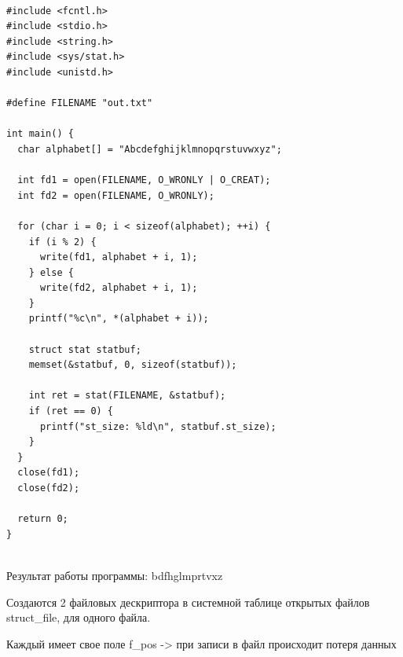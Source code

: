 \begin{lstlisting}

#include <fcntl.h>
#include <stdio.h>
#include <string.h>
#include <sys/stat.h>
#include <unistd.h>

#define FILENAME "out.txt"

int main() {
  char alphabet[] = "Abcdefghijklmnopqrstuvwxyz";

  int fd1 = open(FILENAME, O_WRONLY | O_CREAT);
  int fd2 = open(FILENAME, O_WRONLY);

  for (char i = 0; i < sizeof(alphabet); ++i) {
    if (i % 2) {
      write(fd1, alphabet + i, 1);
    } else {
      write(fd2, alphabet + i, 1);
    }
    printf("%c\n", *(alphabet + i));

    struct stat statbuf;
    memset(&statbuf, 0, sizeof(statbuf));

    int ret = stat(FILENAME, &statbuf);
    if (ret == 0) {
      printf("st_size: %ld\n", statbuf.st_size);
    }
  }
  close(fd1);
  close(fd2);

  return 0;
}
  
\end{lstlisting}

Результат работы программы: bdfhglmprtvxz

Создаются 2 файловых дескриптора в системной таблице открытых файлов
struct\_file, для одного
файла.

Каждый имеет свое поле f\_pos -> при записи в файл происходит потеря данных